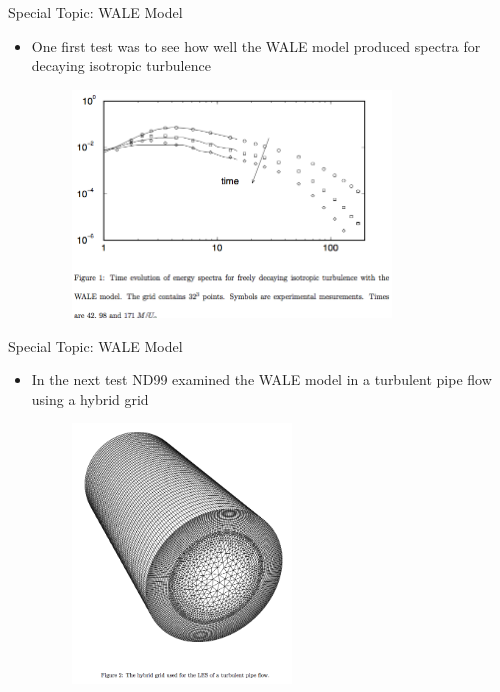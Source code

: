 \begin{frame}{Special Topic: WALE Model}
\begin{itemize}
	\item One first test was to see how well the WALE model produced spectra for decaying isotropic turbulence
	\begin{figure}
		\includegraphics[width=0.8\textwidth]{wale1}
	\end{figure}
\end{itemize}
\end{frame}
\begin{frame}{Special Topic: WALE Model}
\begin{itemize}
	\item In the next test ND99 examined the WALE model in a turbulent pipe flow using a hybrid grid
	\begin{figure}
		\includegraphics[width=0.55\textwidth]{wale2}
	\end{figure}
\end{itemize}
\end{frame}
